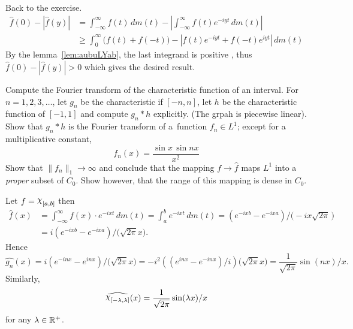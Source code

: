 \begin{enumerate}
Back to the exercise.
\begin{align*}
\hat{f}(0) - |\hat{f}(y)|
&=
   \int_{-\infty}^\infty f(t)\,dm(t)
   - \left| \int_{-\infty}^\infty f(t)e^{-iyt}\,dm(t) \right| \\
&\geq \int_0^\infty
           \bigl(f(t) + f(-t)\bigr) -
           \left| f(t)e^{-iyt} + f(-t)e^{iyt}\right| \,dm(t)
\end{align*}
By the lemma~\ref{lem:aubuLYab}, the last integrand is positive \aded,
thus \(\hat{f}(0) - |\hat{f}(y)| > 0\)
which gives the desired result.



\iffalse
Pick arbitrary \(\epsilon\in(0,\|f\|_1/2)\).
By Theorem~3.14 \cite{RudinRCA87} there exists
a~continuous function $g$ such that \(\|g-f\|_1 < \epsilon\).
We may assume that \(g\geq 0\), otherwise we pick \(|g|\).
By continuity and choice of \(\epsilon\) there exists \(\xi\)
such that \(g(\xi)>0\) and \(a,\delta>0\) such that
\(g(x)\geq a\) whenever \(x\in[\xi-\delta,\xi+\delta]\).
\fi

\begin{excopy}
Compute the Fourier transform of the characteristic function
of an interval. For \(n=1,2,3,\ldots\), let
\(g_n\) be the characteristic if \([-n,n]\),
let $h$ be the characteristic
function of \([-1,1]\) and compute \(g_n \ast h\) explicitly.
(The grpah is piecewise linear).
Show that \(g_n \ast h\) is the Fourier transform
of a~function \(f_n\in L^1\); except for a multiplicative constant,
\begin{equation*}
f_n(x) = \frac{\sin x\,\sin nx}{x^2}
\end{equation*}
Show that \(\|f_n\|_1 \to \infty\) and conclude that the mapping
\(f \to \hat{f}\) maps \(L^1\) into a \emph{proper} subset of \(C_0\).
Show however, that the range of this mapping is dense in \(C_0\).
\end{excopy}

Let \(f=\chhi_{[a,b]}\) then
\begin{align*}
\hat{f}(x)
 &= \int_{-\infty}^\infty f(x)\cdot e^{-ixt}\,dm(t)
  = \int_a^b e^{-ixt}\,dm(t)
  = (e^{-ixb} - e^{-ixa})/\bigl(-ix\sqrt{2\pi}\,\bigr) \\
 &= i(e^{-ixb} - e^{-ixa})/\bigl(\sqrt{2\pi}x\bigr).
\end{align*}
Hence 
\begin{equation*}
\hat{g_n}(x) 
 = i(e^{-inx} - e^{inx})/\bigl(\sqrt{2\pi}x\bigr)
 = -i^2((e^{inx} - e^{-inx})/i)\bigl(\sqrt{2\pi}x\bigr)
 = \frac{1}{\sqrt{2\pi}}\sin(nx)/x.
\end{equation*}
Similarly,
\begin{equation} \label{eq:fourier:chi}
\widehat{\chhi_{[-\lambda,\lambda]}}(x) = \frac{1}{\sqrt{2\pi}}\sin(\lambda x)/x
\end{equation}
for any \(\lambda\in\mathbb{R}^{+}\).



\end{enumerate}
